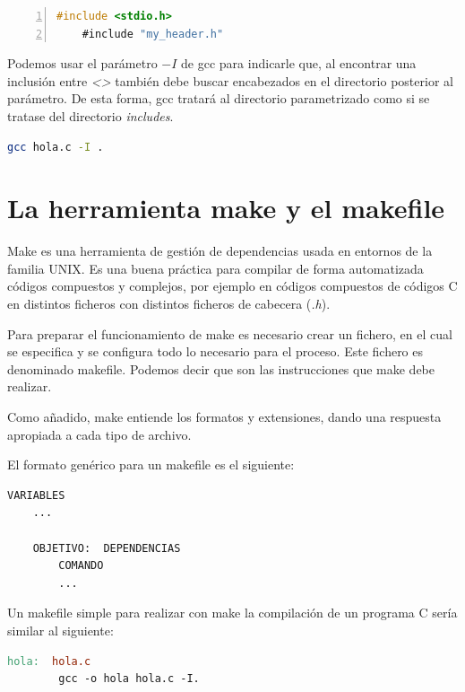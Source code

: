 \documentclass[a4paper, 11pt, titlepage]{article}
\begin{document}
        \begin{lstlisting}[language=C,numbers=left]
    #include <stdio.h>
    #include "my_header.h"\end{lstlisting}

        Podemos usar el parámetro $-I$ de gcc para indicarle que, al encontrar una inclusión 
        entre \textit{\textless\textgreater} también debe buscar encabezados en el directorio 
        posterior al parámetro. De esta forma, gcc tratará al directorio parametrizado como 
        si se tratase del directorio \textit{includes}.
        
        \begin{lstlisting}[language=bash]
    gcc hola.c -I .\end{lstlisting}

\section{La herramienta make y el makefile}\label{make}

    Make es una herramienta de gestión de dependencias usada en entornos de la familia UNIX. 
    Es una buena práctica para compilar de forma automatizada códigos compuestos y complejos, 
    por ejemplo en códigos compuestos de códigos C en distintos ficheros con distintos ficheros
    de cabecera (\textit{.h}).

    Para preparar el funcionamiento de make es necesario crear un fichero, en el cual se especifica
    y se configura todo lo necesario para el proceso. Este fichero es denominado makefile. Podemos
    decir que son las instrucciones que make debe realizar.

    Como añadido, make entiende los formatos y extensiones, dando una respuesta apropiada a cada tipo
    de archivo.

    El formato genérico para un makefile es el siguiente:

    \begin{lstlisting}[language=make]
    VARIABLES
    ...
    
    OBJETIVO:  DEPENDENCIAS 
        COMANDO
        ...\end{lstlisting}

    Un makefile simple para realizar con make la compilación de un programa C sería similar al siguiente:

    \begin{lstlisting}[language=make]
    hola:  hola.c 
        gcc -o hola hola.c -I.\end{lstlisting}
    
\end{document}
